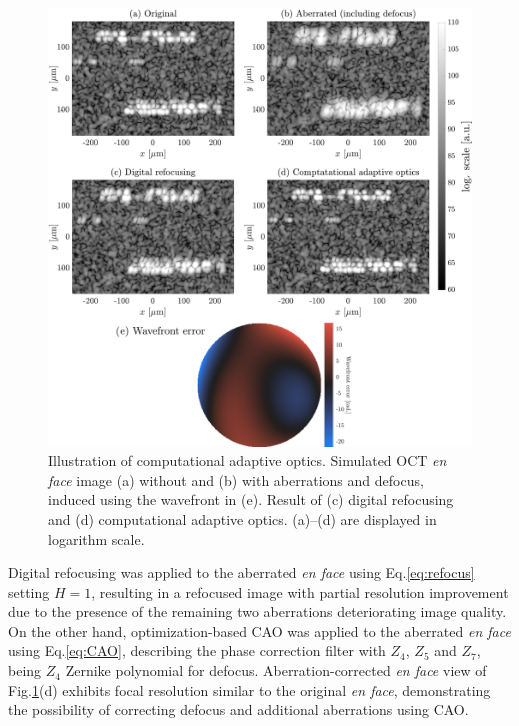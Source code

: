 \begin{figure}[htb!]
	\centering
	\includegraphics[width=\textwidth]{Figures/TheoreticalBasis/CAO.pdf}
	\caption[Illustration of computational adaptive optics.]{Illustration of computational adaptive optics. Simulated OCT \textit{en face} image (a) without and (b) with aberrations and defocus, induced using the wavefront in (e). Result of (c) digital refocusing and (d) computational adaptive optics. (a)--(d) are displayed in logarithm scale.}
	\label{fig:CAO}
\end{figure}

Digital refocusing was applied to the aberrated \textit{en face} using Eq.\eqref{eq:refocus} setting $H=1$, resulting in a refocused image with partial resolution improvement due to the presence of the remaining two aberrations deteriorating image quality. On the other hand, optimization-based CAO was applied to the aberrated \textit{en face} using Eq.\eqref{eq:CAO}, describing the phase correction filter with $Z_4$, $Z_5$ and $Z_7$, being $Z_4$ Zernike polynomial for defocus. Aberration-corrected \textit{en face} view of Fig.\ref{fig:CAO}(d) exhibits focal resolution similar to the original \textit{en face}, demonstrating the possibility of correcting defocus and additional aberrations using CAO.


